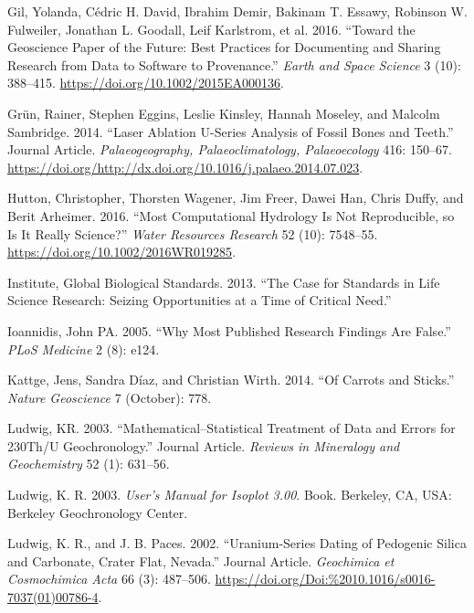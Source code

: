 \documentclass[]{elsarticle} %
\newlength{\cslhangindent}
\newenvironment{cslreferences}%
  {\setlength{\parindent}{0pt}%
  \everypar{\setlength{\hangindent}{\cslhangindent}}\ignorespaces}%
  {\par}
\begin{document}
\begin{cslreferences}
\leavevmode\hypertarget{ref-Gil_et_al_2016}{}%
Gil, Yolanda, Cédric H. David, Ibrahim Demir, Bakinam T. Essawy, Robinson W. Fulweiler, Jonathan L. Goodall, Leif Karlstrom, et al. 2016. ``Toward the Geoscience Paper of the Future: Best Practices for Documenting and Sharing Research from Data to Software to Provenance.'' \emph{Earth and Space Science} 3 (10): 388--415. \url{https://doi.org/10.1002/2015EA000136}.

\leavevmode\hypertarget{ref-Gruen2014}{}%
Grün, Rainer, Stephen Eggins, Leslie Kinsley, Hannah Moseley, and Malcolm Sambridge. 2014. ``Laser Ablation U-Series Analysis of Fossil Bones and Teeth.'' Journal Article. \emph{Palaeogeography, Palaeoclimatology, Palaeoecology} 416: 150--67. \url{https://doi.org/http://dx.doi.org/10.1016/j.palaeo.2014.07.023}.

\leavevmode\hypertarget{ref-Hutton_et_al_2016}{}%
Hutton, Christopher, Thorsten Wagener, Jim Freer, Dawei Han, Chris Duffy, and Berit Arheimer. 2016. ``Most Computational Hydrology Is Not Reproducible, so Is It Really Science?'' \emph{Water Resources Research} 52 (10): 7548--55. \url{https://doi.org/10.1002/2016WR019285}.

\leavevmode\hypertarget{ref-global2013case}{}%
Institute, Global Biological Standards. 2013. ``The Case for Standards in Life Science Research: Seizing Opportunities at a Time of Critical Need.''

\leavevmode\hypertarget{ref-ioannidis2005most}{}%
Ioannidis, John PA. 2005. ``Why Most Published Research Findings Are False.'' \emph{PLoS Medicine} 2 (8): e124.

\leavevmode\hypertarget{ref-Kattge_Diaz_Wirth_2014}{}%
Kattge, Jens, Sandra Díaz, and Christian Wirth. 2014. ``Of Carrots and Sticks.'' \emph{Nature Geoscience} 7 (October): 778.

\leavevmode\hypertarget{ref-RN4370}{}%
Ludwig, KR. 2003. ``Mathematical--Statistical Treatment of Data and Errors for 230Th/U Geochronology.'' Journal Article. \emph{Reviews in Mineralogy and Geochemistry} 52 (1): 631--56.

\leavevmode\hypertarget{ref-RN2163}{}%
Ludwig, K. R. 2003. \emph{User's Manual for Isoplot 3.00}. Book. Berkeley, CA, USA: Berkeley Geochronology Center.

\leavevmode\hypertarget{ref-RN801}{}%
Ludwig, K. R., and J. B. Paces. 2002. ``Uranium-Series Dating of Pedogenic Silica and Carbonate, Crater Flat, Nevada.'' Journal Article. \emph{Geochimica et Cosmochimica Acta} 66 (3): 487--506. \url{https://doi.org/Doi:\%2010.1016/s0016-7037(01)00786-4}.


\end{cslreferences}
\end{document}
